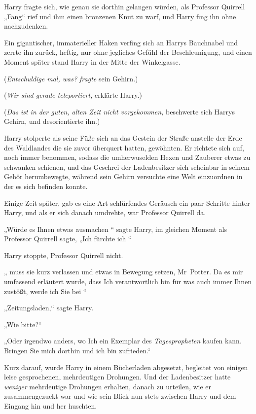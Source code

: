 {Harry fragte sich, wie genau sie dorthin gelangen würden, als Professor Quirrell „Fang“ rief und ihm einen bronzenen Knut zu warf, und Harry fing ihn ohne nachzudenken.

Ein gigantischer, immaterieller Haken verfing sich an Harrys Bauchnabel und zerrte ihn zurück, heftig, nur ohne jegliches Gefühl der Beschleunigung, und einen Moment später stand Harry in der Mitte der Winkelgasse.

(\emph{Entschuldige mal, was? fragte} sein Gehirn.)

(\emph{Wir sind gerade teleportiert,} erklärte Harry.)

(\emph{Das ist in der guten, alten Zeit nicht vorgekommen,} beschwerte sich Harrys Gehirn, und desorientierte ihn.)

Harry stolperte als seine Füße sich an das Gestein der Straße anstelle der Erde des Waldlandes die sie zuvor überquert hatten, gewöhnten. Er richtete sich auf, noch immer benommen, sodass die umherwuselden Hexen und Zauberer etwas zu schwanken schienen, und das Geschrei der Ladenbesitzer sich scheinbar in seinem Gehör herumbewegte, während sein Gehirn versuchte eine Welt einzuordnen in der es sich befinden konnte.

Einige Zeit später, gab es eine Art schlürfendes Geräusch ein paar Schritte hinter Harry, und als er sich danach umdrehte, war Professor Quirrell da.

„Würde es Ihnen etwas ausmachen \later“ sagte Harry, im gleichen Moment als Professor Quirrell sagte, „Ich fürchte ich \later“

Harry stoppte, Professor Quirrell nicht.

„ muss sie kurz verlassen und etwas in Bewegung setzen, Mr~Potter. Da es mir umfassend erläutert wurde, dass Ich verantwortlich bin für was auch immer Ihnen zustößt, werde ich Sie bei \later“

„Zeitungsladen,“ sagte Harry.

„Wie bitte?“

„Oder irgendwo anders, wo Ich ein Exemplar des \emph{Tagespropheten} kaufen kann. Bringen Sie mich dorthin und ich bin zufrieden.“

Kurz darauf, wurde Harry in einem Bücherladen abgesetzt, begleitet von einigen leise gesprochenen, mehrdeutigen Drohungen. Und der Ladenbesitzer hatte \emph{weniger} mehrdeutige Drohungen erhalten, danach zu urteilen, wie er zusammengezuckt war und wie sein Blick nun stets zwischen Harry und dem Eingang hin und her huschten.

}
